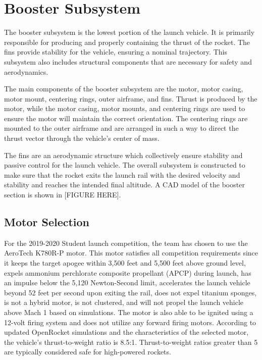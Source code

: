 \section{Booster Subsystem}
The booster subsystem is the lowest portion of the launch vehicle. It is primarily responsible for producing and properly containing the thrust of the rocket. The fins provide stability for the vehicle, ensuring a nominal trajectory. This subsystem also includes structural components that are necessary for safety and aerodynamics.

The main components of the booster subsystem are the motor, motor casing, motor mount, centering rings, outer airframe, and fins. Thrust is produced by the motor, while the motor casing, motor mounts, and centering rings are used to ensure the motor will maintain the correct orientation. The centering rings are mounted to the outer airframe and are arranged in such a way to direct the thrust vector through the vehicle’s center of mass.

The fins are an aerodynamic structure which collectively ensure stability and passive control for the launch vehicle. The overall subsystem is constructed to make sure that the rocket exits the launch rail with the desired velocity and stability and reaches the intended final altitude. A CAD model of the booster section is shown in [FIGURE HERE].

    \subsection{Motor Selection}
For the 2019-2020 Student launch competition, the team has chosen to use the AeroTech K780R-P motor. This motor satisfies all competition requirements since it keeps the target apogee within 3,500 feet and 5,500 feet above ground level, expels ammonium perchlorate composite propellant (APCP) during launch, has an impulse below the 5,120 Newton-Second limit, accelerates the launch vehicle beyond 52 feet per second upon exiting the rail, does not expel titanium sponges, is not a hybrid motor, is not clustered, and will not propel the launch vehicle above Mach 1 based on simulations. The motor is also able to be ignited using a 12-volt firing system and does not utilize any forward firing motors. According to updated OpenRocket simulations and the characteristics of the selected motor, the vehicle’s thrust-to-weight ratio is 8.5:1. Thrust-to-weight ratios greater than 5 are typically considered safe for high-powered rockets.

